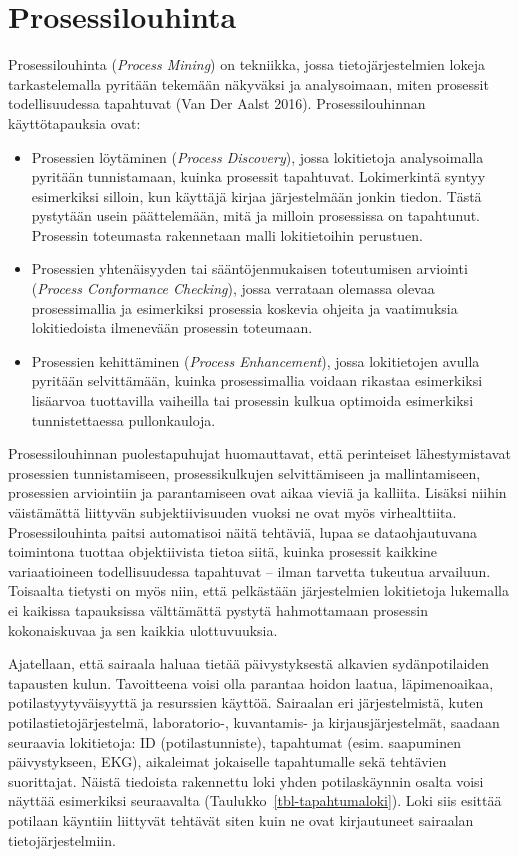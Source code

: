 \documentclass[
  finnish,
  letterpaper,
  DIV=11,
  numbers=noendperiod,
  oneside]{scrreprt}
\providecommand{\tightlist}{%
  \setlength{\itemsep}{0pt}\setlength{\parskip}{0pt}}
\begin{document}
\section{Prosessilouhinta}\label{prosessilouhinta}

Prosessilouhinta (\emph{Process Mining}) on tekniikka, jossa
tietojärjestelmien lokeja tarkastelemalla pyritään tekemään näkyväksi ja
analysoimaan, miten prosessit todellisuudessa tapahtuvat (Van Der Aalst
2016). Prosessilouhinnan käyttötapauksia ovat:

\begin{itemize}
\tightlist
\item
  Prosessien löytäminen (\emph{Process Discovery}), jossa lokitietoja
  analysoimalla pyritään tunnistamaan, kuinka prosessit tapahtuvat.
  Lokimerkintä syntyy esimerkiksi silloin, kun käyttäjä kirjaa
  järjestelmään jonkin tiedon. Tästä pystytään usein päättelemään, mitä
  ja milloin prosessissa on tapahtunut. Prosessin toteumasta rakennetaan
  malli lokitietoihin perustuen.
\item
  Prosessien yhtenäisyyden tai sääntöjenmukaisen toteutumisen arviointi
  (\emph{Process Conformance Checking}), jossa verrataan olemassa olevaa
  prosessimallia ja esimerkiksi prosessia koskevia ohjeita ja
  vaatimuksia lokitiedoista ilmenevään prosessin toteumaan.
\item
  Prosessien kehittäminen (\emph{Process Enhancement}), jossa
  lokitietojen avulla pyritään selvittämään, kuinka prosessimallia
  voidaan rikastaa esimerkiksi lisäarvoa tuottavilla vaiheilla tai
  prosessin kulkua optimoida esimerkiksi tunnistettaessa pullonkauloja.
\end{itemize}

Prosessilouhinnan puolestapuhujat huomauttavat, että perinteiset
lähestymistavat prosessien tunnistamiseen, prosessikulkujen
selvittämiseen ja mallintamiseen, prosessien arviointiin ja
parantamiseen ovat aikaa vieviä ja kalliita. Lisäksi niihin väistämättä
liittyvän subjektiivisuuden vuoksi ne ovat myös virhealttiita.
Prosessilouhinta paitsi automatisoi näitä tehtäviä, lupaa se
dataohjautuvana toimintona tuottaa objektiivista tietoa siitä, kuinka
prosessit kaikkine variaatioineen todellisuudessa tapahtuvat -- ilman
tarvetta tukeutua arvailuun. Toisaalta tietysti on myös niin, että
pelkästään järjestelmien lokitietoja lukemalla ei kaikissa tapauksissa
välttämättä pystytä hahmottamaan prosessin kokonaiskuvaa ja sen kaikkia
ulottuvuuksia.

Ajatellaan, että sairaala haluaa tietää päivystyksestä alkavien
sydänpotilaiden tapausten kulun. Tavoitteena voisi olla parantaa hoidon
laatua, läpimenoaikaa, potilastyytyväisyyttä ja resurssien käyttöä.
Sairaalan eri järjestelmistä, kuten potilastietojärjestelmä,
laboratorio-, kuvantamis- ja kirjausjärjestelmät, saadaan seuraavia
lokitietoja: ID (potilastunniste), tapahtumat (esim. saapuminen
päivystykseen, EKG), aikaleimat jokaiselle tapahtumalle sekä tehtävien
suorittajat. Näistä tiedoista rakennettu loki yhden potilaskäynnin
osalta voisi näyttää esimerkiksi seuraavalta
(Taulukko~\ref{tbl-tapahtumaloki}). Loki siis esittää potilaan käyntiin
liittyvät tehtävät siten kuin ne ovat kirjautuneet sairaalan
tietojärjestelmiin.
\end{document}
